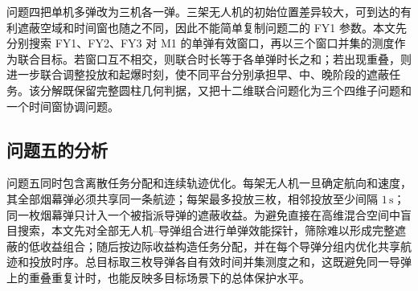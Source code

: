 问题四把单机多弹改为三机各一弹。三架无人机的初始位置差异较大，可到达的有利遮蔽空域和时间窗也随之不同，因此不能简单复制问题二的 FY1 参数。本文先分别搜索 FY1、FY2、FY3 对 M1 的单弹有效窗口，再以三个窗口并集的测度作为联合目标。若窗口互不相交，则联合时长等于各单弹时长之和；若出现重叠，则进一步联合调整投放和起爆时刻，使不同平台分别承担早、中、晚阶段的遮蔽任务。该分解既保留完整圆柱几何判据，又把十二维联合问题化为三个四维子问题和一个时间窗协调问题。

\subsection{问题五的分析}

问题五同时包含离散任务分配和连续轨迹优化。每架无人机一旦确定航向和速度，其全部烟幕弹必须共享同一条航迹；每架最多投放三枚，相邻投放至少间隔 $1\,\mathrm{s}$；同一枚烟幕弹只计入一个被指派导弹的遮蔽收益。为避免直接在高维混合空间中盲目搜索，本文先对全部无人机--导弹组合进行单弹效能探针，筛除难以形成完整遮蔽的低收益组合；随后按边际收益构造任务分配，并在每个导弹分组内优化共享航迹和投放时序。总目标取三枚导弹各自有效时间并集测度之和，这既避免同一导弹上的重叠重复计时，也能反映多目标场景下的总体保护水平。

\endinput

\section{模板的基本使用}

\subsection{LaTeX 发行版和编辑器安装}

要用 \LaTeX{} 来完成建模论文，首先要确保正确安装一个 \LaTeX{} 的发行版本。

\begin{itemize}
    \item Mac 下可用 Mac\TeX{}
    \item Linux 下可用 \TeX{}Live ；
    \item windows 下可用 \TeX{}Live 或 Mik\TeX{} ;
\end{itemize}

具体安装可以参考 \href{https://github.com/OsbertWang/install-latex-guide-zh-cn/releases/}{Install-LaTeX-Guide-zh-cn} 或者其它靠谱的文章。另外可以安装一个易用的编辑器，例如 \href{https://mirrors.tuna.tsinghua.edu.cn/github-release/texstudio-org/texstudio/LatestRelease/}{\TeX{}studio} 。

